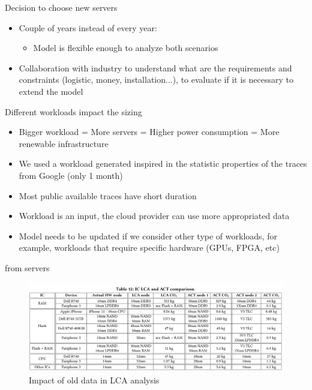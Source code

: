 \documentclass[Ligatures=TeX,table,svgnames,usetotalslideindicator,compress,10pt,aspectratio=169]{beamer}
\begin{document}
\begin{frame}{Decision to choose new servers}
\begin{itemize} 

    \item Couple of years instead of every year:
    
    \begin{itemize}    
    \item Model is flexible enough to analyze both scenarios
    \end{itemize}
    
    \item Collaboration with industry to understand what are the requirements and constraints (logistic, money, installation...), to evaluate if it is necessary to extend the model
    
\end{itemize}
\end{frame}

\begin{frame}{Different workloads impact the sizing}
\begin{itemize}    
    \item Bigger workload = More servers = Higher power consumption = More renewable infrastructure
    \item We used a workload generated inspired in the statistic properties of the traces from Google (only 1 month)
    \item Most  public available traces have short duration    
    \item Workload is an input, the cloud provider can use more appropriated  data
    \item Model needs to be updated if we consider other type of workloads, for example, workloads that require specific hardware (GPUs, FPGA, etc)
\end{itemize}
\end{frame}


\begin{frame}{ from servers}

  \begin{center}
    \begin{figure}[h]    
      \centering
      \includegraphics[width=.9\textwidth]{images/act_data.png}
      \caption{Impact of old data in LCA analysis}
    \end{figure}    
  \end{center}  


\end{frame}
\end{document}
